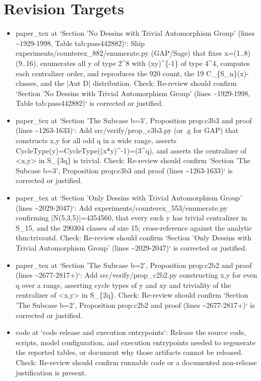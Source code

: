 \documentclass[11pt]{article}
\begin{document}
\section*{Revision Targets}
\begin{itemize}[leftmargin=*]
  \item [open] paper\_tex at `Section 'No Dessins with Trivial Automorphism Group' (lines \~{}1929-1998, Table tab:pass442882)`: Ship experiments/counterex\_882/enumerate.py (GAP/Sage) that fixes x=(1..8)(9..16), enumerates all y of type 2\^{}8 with (xy)\^{}\{-1\} of type 4\^{}4, computes each centralizer order, and reproduces the 920 count, the 19 C\_\{S\_n\}(x)-classes, and the |Aut D| distribution. Check: Re-review should confirm `Section 'No Dessins with Trivial Automorphism Group' (lines \~{}1929-1998, Table tab:pass442882)` is corrected or justified.
  \item [open] paper\_tex at `Section 'The Subcase b=3', Proposition prop:c3b3 and proof (lines \~{}1263-1633)`: Add src/verify/prop\_c3b3.py (or .g for GAP) that constructs x,y for all odd q in a wide range, asserts CycleType(y)=CycleType((x*y)\^{}-1)=(3\^{}q), and asserts the centralizer of <x,y> in S\_\{3q\} is trivial. Check: Re-review should confirm `Section 'The Subcase b=3', Proposition prop:c3b3 and proof (lines \~{}1263-1633)` is corrected or justified.
  \item [open] paper\_tex at `Section 'Only Dessins with Trivial Automorphism Group' (lines \~{}2029-2047)`: Add experiments/counterex\_553/enumerate.py confirming |N(5,3,5)|=4354560, that every such y has trivial centralizer in S\_15, and the 290304 classes of size 15; cross-reference against the analytic thm:trivautd. Check: Re-review should confirm `Section 'Only Dessins with Trivial Automorphism Group' (lines \~{}2029-2047)` is corrected or justified.
  \item [open] paper\_tex at `Section 'The Subcase b=2', Proposition prop:c2b2 and proof (lines \~{}2677-2817+)`: Add src/verify/prop\_c2b2.py constructing x,y for even q over a range, asserting cycle types of y and xy and triviality of the centralizer of <x,y> in S\_\{2q\}. Check: Re-review should confirm `Section 'The Subcase b=2', Proposition prop:c2b2 and proof (lines \~{}2677-2817+)` is corrected or justified.
  \item [open] code at `code release and execution entrypoints`: Release the source code, scripts, model configuration, and execution entrypoints needed to regenerate the reported tables, or document why those artifacts cannot be released. Check: Re-review should confirm runnable code or a documented non-release justification is present.

\end{itemize}
\end{document}

